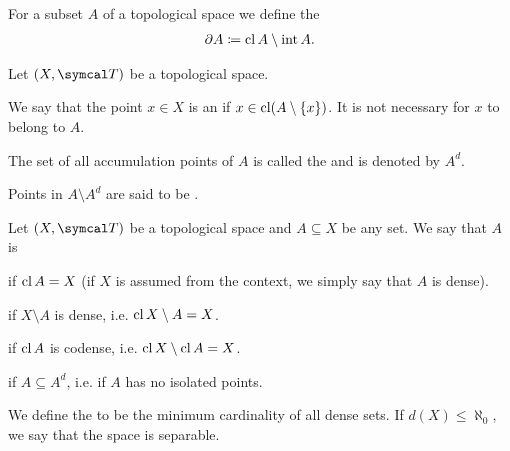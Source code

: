 \begin{definition}\label{def:topological_boundary}\cite[24]{Engelking1989}
  For a subset $A$ of a topological space we define the 
  \begin{align*}
    \partial A \coloneqq \operatorname{cl}{A} \setminus \operatorname{int}{A}.
  \end{align*}
\end{definition}

\begin{definition}\label{def:topologically_derived_set}\cite[24]{Engelking1989}
  Let $(X, \Cal{T})$ be a topological space.

  \begin{defenum}
    \item\label{def:topologically_derived_set/accumulation_point} We say that the point $x \in X$ is an  if $x \in \operatorname{cl}(A \setminus \{ x \})$. It is not necessary for $x$ to belong to $A$.

    \item\label{def:topologically_derived_set/derived_set} The set of all accumulation points of $A$ is called the  and is denoted by $A^d$.

    \item\label{def:topologically_derived_set/isolated_point} Points in $A \setminus A^d$ are said to be .
  \end{defenum}
\end{definition}

\begin{definition}\label{def:topologically_dense_set}\cite[25]{Engelking1989}
  Let $(X, \Cal{T})$ be a topological space and $A \subseteq X$ be any set. We say that $A$ is

  \begin{defenum}
    \item\label{def:topologically_dense_set/dense}  if $\operatorname{cl}{A} = X$ (if $X$ is assumed from the context, we simply say that $A$ is dense).

    \item\label{def:topologically_dense_set/codense}  if $X \setminus A$ is dense, i.e. $\operatorname{cl}{X \setminus A} = X$.

    \item\label{def:topologically_dense_set/nowhere_dense}  if $\operatorname{cl}{A}$ is codense, i.e. $\operatorname{cl}{X \setminus \operatorname{cl}{A}} = X$.

    \item\label{def:topologically_dense_set/dense_in_itself}  if $A \subseteq A^d$, i.e. if $A$ has no isolated points.
  \end{defenum}

  We define the  to be the minimum cardinality of all dense sets. If $d(X) \leq \aleph_0$, we say that the space is separable.
\end{definition}
